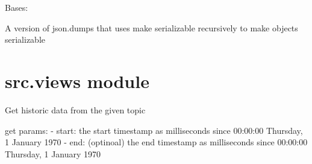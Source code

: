 \documentclass[letterpaper,10pt,english]{sphinxmanual}
\begin{document}
\begin{fulllineitems}
\label{\detokenize{src:src.utils.RouteTableDefDocs}}
Bases: 

\end{fulllineitems}


\begin{fulllineitems}
\label{\detokenize{src:src.utils.dumps}}
A version of json.dumps that uses make serializable recursively to make objects serializable

\end{fulllineitems}



\section{src.views module}
\label{\detokenize{src:module-src.views}}\label{\detokenize{src:src-views-module}}

\begin{fulllineitems}
\label{\detokenize{src:src.views.history}}
Get historic data from the given topic

get params:
- start: the start timestamp as milliseconds since 00:00:00 Thursday, 1 January 1970
- end: (optinoal) the end timestamp as milliseconds since 00:00:00 Thursday, 1 January 1970

\end{fulllineitems}

\end{document}
